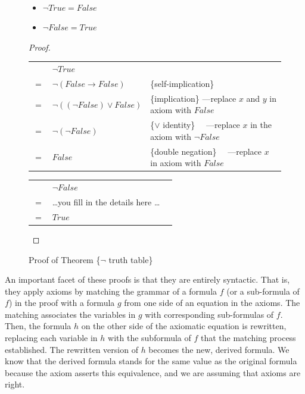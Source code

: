 \begin{figure}
\begin{theorem}
\mbox{}\\
\begin{itemize}
\item $\neg True = False$
\item $\neg False = True$
\end{itemize}
\end{theorem}
\begin{proof}
\mbox{} \\
\begin{tabular}{llp{3.15in}}
    & $\neg True$                      & \\
$=$ & $\neg (False \rightarrow False)$ & \{self-implication\} \\
$=$ & $\neg ((\neg False) \vee False)$ & \{implication\}     ---replace $x$ and $y$ in axiom with $False$ \\
$=$ & $\neg (\neg False)$              & \{$\vee$ identity\} ~~---replace $x$ in the axiom with $\neg False$ \\
$=$ & $False$                          & \{double negation\} ~~---replace $x$ in axiom with $False$ \\
\end{tabular}

\bigskip
\noindent
\begin{tabular}{lll}
    & $\neg False$                             & \\
$=$ & \dots you fill in the details here \dots & \\
$=$ & $True$                                   & \\
\end{tabular}

\end{proof}
\caption{Proof of Theorem \{$\neg$ truth table\}}
\label{fig:neg-truth-table}
\end{figure}

An important facet of these proofs is that they are
entirely syntactic. That is, they apply axioms by
matching the grammar of a formula $f$ (or a sub-formula of $f$) in the proof
with a formula $g$ from one side of an equation in the axioms.
The matching associates the variables in $g$ with corresponding sub-formulas of $f$.
Then, the formula $h$ on the other side of
the axiomatic equation is rewritten,
replacing each variable in $h$ with the subformula of $f$
that the matching process established.
The rewritten version of $h$
becomes the new, derived formula.
We know that the derived formula stands for the same value
as the original formula because the axiom asserts this equivalence,
and we are assuming that axioms are right.


